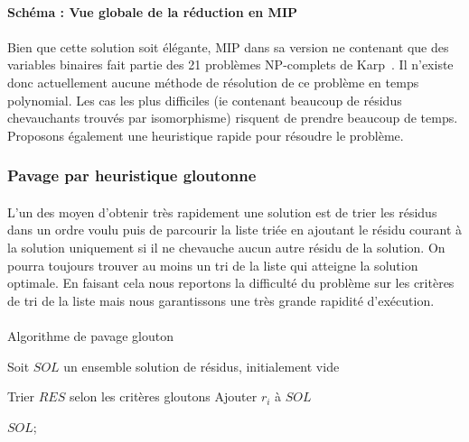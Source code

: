 \documentclass[12pt,french,twoside]{report}
\begin{document}
\paragraph{Schéma : Vue globale de la réduction en MIP}

\paragraph{}Bien que cette solution soit élégante, MIP dans sa version ne contenant que des variables binaires fait partie des 21 problèmes NP-complets de Karp~\cite{karp_reducibility_1972}.
Il n'existe donc actuellement aucune méthode de résolution de ce problème en temps polynomial.
Les cas les plus difficiles (ie contenant beaucoup de résidus chevauchants trouvés par isomorphisme) risquent de prendre beaucoup de temps.
Proposons également une heuristique rapide pour résoudre le problème.



\subsubsection{Pavage par heuristique gloutonne}

\label{TM_p}

\paragraph{}L'un des moyen d'obtenir très rapidement une solution est de trier les résidus dans un ordre voulu puis de parcourir la liste triée en ajoutant le résidu courant à la solution uniquement si il ne chevauche aucun autre résidu de la solution.
On pourra toujours trouver au moins un tri de la liste qui atteigne la solution optimale.
En faisant cela nous reportons la difficulté du problème sur les critères de tri de la liste mais nous garantissons une très grande rapidité d'exécution.

\paragraph{}
\begin{algorithm}[H]
  \caption{Algorithme de pavage glouton}
  Soit $SOL$ un ensemble solution de résidus, initialement vide\;
  
  Trier $RES$ selon les critères gloutons\;
   {
     {
      Ajouter $r_i$ à $SOL$\;
    }
  }
  
  \KwRet $SOL$;
\end{algorithm}
\end{document}
